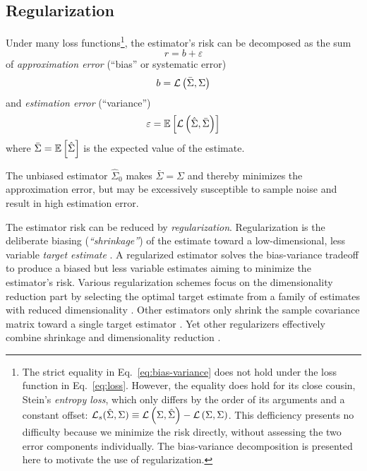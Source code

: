  \subsection*{Regularization}
 Under many loss functions\footnote{
 The strict equality in Eq.~\ref{eq:bias-variance} does not hold under the loss function in Eq.~\ref{eq:loss}. However, the equality does hold for its close cousin, Stein's \emph{entropy loss},  which only differs by the order of its arguments and a constant offset: $\mathcal L_s(\hat\Sigma,\Sigma) \equiv \mathcal L\left(\Sigma,\hat\Sigma\right) - \mathcal L\left(\Sigma,\Sigma\right)$. This defficiency presents no difficulty because we minimize the risk directly, without assessing the two error components individually. The bias-variance decomposition is presented here to motivate the use of regularization.}, 
 the estimator's risk can be decomposed as the sum
 \begin{equation}\label{eq:bias-variance}
 r = b + \varepsilon
 \end{equation}
 of \emph{approximation error} (``bias'' or systematic error)
 \begin{equation}
 b = \mathcal L\left(\bar\Sigma,\Sigma\right)
 \end{equation}
 and \emph{estimation error} (``variance'') 
 \begin{equation}
 \varepsilon = \mathbb E\left[ \mathcal L\left(\hat\Sigma, \bar\Sigma\right)\right]
 \end{equation}
 where $\bar\Sigma = \mathbb E\left[ \hat\Sigma\right]$ is the expected value of the estimate. 

 The unbiased estimator $\hat\Sigma_0$ makes $\bar\Sigma=\Sigma$ and thereby minimizes the approximation error, but may be excessively susceptible to sample noise and result in high estimation error.

 The estimator risk can be reduced by \emph{regularization}. Regularization is the deliberate biasing (\emph{``shrinkage''}) of the estimate toward a low-dimensional, less variable \emph{target estimate} \cite{Bickel:2006,Ledoit:2004}. A regularized estimator solves the bias-variance tradeoff to produce a biased but less variable estimates aiming to minimize the estimator's risk.  Various regularization schemes focus on the dimensionality reduction part  by selecting the optimal target estimate from a family of estimates with reduced dimensionality \cite{findit}.  Other estimators only shrink the sample covariance matrix toward a single target estimator \cite{Schafer:2005}. Yet other regularizers effectively combine shrinkage and dimensionality reduction \cite{findit}.
